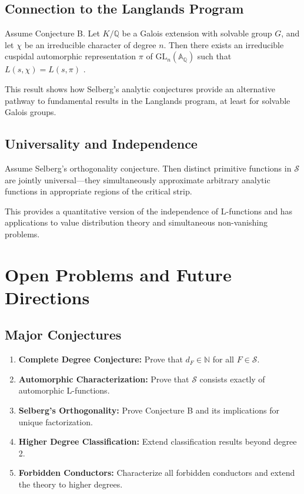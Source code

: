 \subsection{Connection to the Langlands Program}

\begin{theorem}
Assume Conjecture B. Let $K/\mathbb{Q}$ be a Galois extension with solvable group $G$, and let $\chi$ be an irreducible character of degree $n$. Then there exists an irreducible cuspidal automorphic representation $\pi$ of $\text{GL}_n(\mathbb{A}_\mathbb{Q})$ such that $L(s,\chi) = L(s,\pi)$ \cite{langlands1976}.
\end{theorem}

This result shows how Selberg's analytic conjectures provide an alternative pathway to fundamental results in the Langlands program, at least for solvable Galois groups.

\subsection{Universality and Independence}

\begin{theorem}
Assume Selberg's orthogonality conjecture. Then distinct primitive functions in $\mathcal{S}$ are jointly universal---they simultaneously approximate arbitrary analytic functions in appropriate regions of the critical strip.
\end{theorem}

This provides a quantitative version of the independence of L-functions and has applications to value distribution theory and simultaneous non-vanishing problems.

\section{Open Problems and Future Directions}

\subsection{Major Conjectures}

\begin{enumerate}
\item \textbf{Complete Degree Conjecture:} Prove that $d_F \in \mathbb{N}$ for all $F \in \mathcal{S}$.

\item \textbf{Automorphic Characterization:} Prove that $\mathcal{S}$ consists exactly of automorphic L-functions.

\item \textbf{Selberg's Orthogonality:} Prove Conjecture B and its implications for unique factorization.

\item \textbf{Higher Degree Classification:} Extend classification results beyond degree 2.

\item \textbf{Forbidden Conductors:} Characterize all forbidden conductors and extend the theory to higher degrees.
\end{enumerate}


